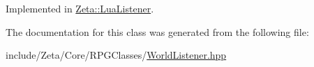 Implemented in \hyperlink{classZeta_1_1LuaListener_a2a146ab94f79bc94242e8f14d39fe11c}{Zeta\+::\+Lua\+Listener}.



The documentation for this class was generated from the following file\+:\begin{DoxyCompactItemize}
\item 
include/\+Zeta/\+Core/\+R\+P\+G\+Classes/\hyperlink{WorldListener_8hpp}{World\+Listener.\+hpp}\end{DoxyCompactItemize}
